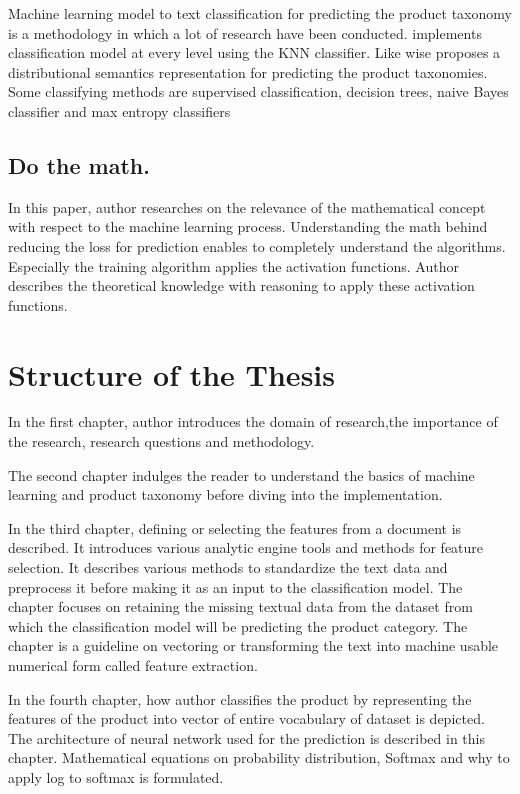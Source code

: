 Machine learning model to text classification for predicting the product taxonomy is a methodology in which a lot of research have been conducted. \cite{AliCevahir.} implements classification model at every level using the \acl*{KNN} classifier. Like wise \parencite{Gupta.20062016}  proposes a distributional semantics representation for predicting the product taxonomies.  Some classifying methods are supervised classification, decision trees, naive Bayes classifier and max entropy classifiers \parencite{BirdKleinLoper09}

\subsection{Do the math.}

In this paper, author researches on the relevance of the mathematical concept with respect to the machine learning process. Understanding the math behind reducing the loss for prediction enables to completely understand the algorithms. Especially the training algorithm applies the activation functions. Author describes the theoretical knowledge with reasoning to apply these activation functions.  

\clearpage

\section{Structure of the Thesis}

In the first chapter, author introduces the domain of research,the importance of the research, research questions and methodology.

The second chapter indulges the reader to understand the basics of machine learning and product taxonomy before diving into the implementation.

In the third chapter, defining or selecting the features from a document is described. It introduces various analytic engine tools and methods for feature selection. It describes various methods to standardize the text data and preprocess it before making it as an input to the classification model. The chapter focuses on retaining the missing textual data from the dataset from which the classification model will be predicting the product category. The chapter is a guideline on vectoring or transforming the text into machine usable numerical form called feature extraction.

In the fourth chapter, how author classifies the product by representing the features of the product into vector of entire vocabulary of dataset is depicted. The architecture of neural network used for the prediction is described in this chapter. Mathematical equations on probability distribution, Softmax and why to apply log to softmax is formulated. 

